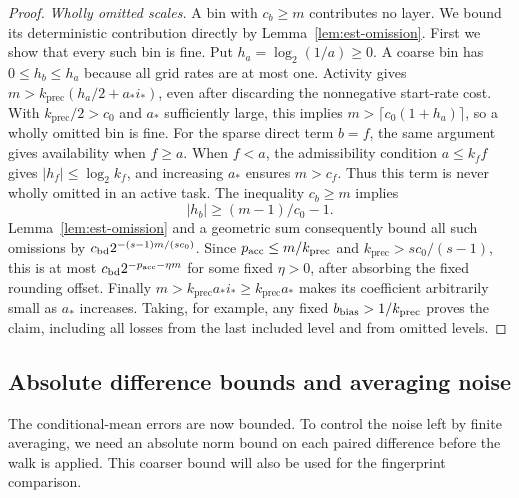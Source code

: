 \documentclass[11pt]{article}
\numberwithin{equation}{section}
\theoremstyle{definition}
\theoremstyle{remark}
\begin{document}
\begin{proof}
\emph{Wholly omitted scales.}  A bin with $c_b\ge {m}$ contributes no
layer.  We bound its deterministic contribution directly by
Lemma~\ref{lem:est-omission}.  First we show that every such bin is fine.
Put ${h_a}=\log_2(1/a)\ge0$.
A coarse bin has $0\le h_b\le {h_a}$ because all grid rates are at most one.
Activity gives
${m}>{k}_{\mathrm{prec}}({h_a}/2+{a}_*i_*)$, even after discarding the nonnegative
start-rate cost.  With ${k}_{\mathrm{prec}}/2>c_0$ and ${a}_*$ sufficiently large,
this implies ${m}>\lceil c_0(1+{h_a})\rceil$, so a wholly omitted bin is fine.
For the sparse direct term $b=f$, the same argument gives availability
when $f\ge a$.  When $f<a$, the admissibility condition $a\le {k}_f f$
gives $|h_f|\le\log_2 {k}_f$, and increasing ${a}_*$ ensures ${m}>c_f$.
Thus this term is never wholly omitted in an active task.
The inequality $c_b\ge {m}$ implies
\[
 |h_b|\ge ({m}-1)/c_0-1.
\]
Lemma~\ref{lem:est-omission} and a geometric sum consequently bound all
such omissions by
${c_{\rm bd}}2^{-(s-1){m}/(s c_0)}$.  Since ${p_{\rm acc}}\le {m}/{k}_{\mathrm{prec}}$ and
${k}_{\mathrm{prec}}>s c_0/(s-1)$, this is at most
${c_{\rm bd}}2^{-{p_{\rm acc}}-\eta {m}}$ for some fixed $\eta>0$, after absorbing the fixed
rounding offset.  Finally ${m}>{k}_{\mathrm{prec}}{a}_*i_*\ge {k}_{\mathrm{prec}}{a}_*$
makes its coefficient arbitrarily small as ${a}_*$ increases.
Taking, for example, any fixed ${b_{\rm bias}}>1/{k}_{\mathrm{prec}}$ proves the claim,
including all losses from the last included level and from omitted levels.
\end{proof}

\subsection{Absolute difference bounds and averaging noise}

The conditional-mean errors are now bounded.  To control the noise left
by finite averaging, we need an absolute norm bound on each paired
difference before the walk is applied.  This coarser bound will also be
used for the fingerprint comparison.
\end{document}

